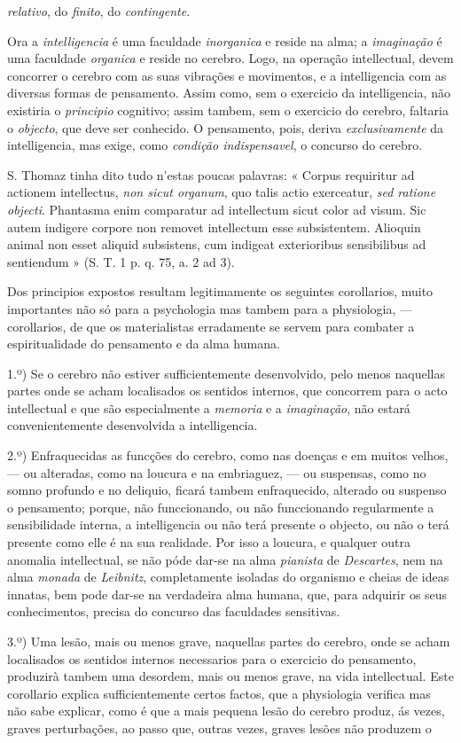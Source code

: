 \emph{relativo}, do \emph{finito}, do \emph{contingente}.\par Ora a \emph{intelligencia} é uma faculdade \emph{inorganica} e reside na alma; a \emph{imaginação} é uma faculdade \emph{organica} e reside no cerebro. Logo, na operação intellectual, devem concorrer o cerebro com as suas vibrações e movimentos, e a intelligencia com as diversas formas de pensamento. Assim como, sem o exercicio da intelligencia, não existiria o \emph{principio} cognitivo; assim tambem, sem o exercicio do cerebro, faltaria o \emph{objecto}, que deve ser conhecido. O pensamento, pois, deriva \emph{exclusivamente} da intelligencia, mas exige, como \emph{condição indispensavel}, o concurso do cerebro.\par S. Thomaz tinha dito tudo n'estas poucas palavras: « Corpus requiritur ad actionem intellectus, \emph{non sicut organum}, quo talis actio exerceatur, \emph{sed ratione objecti}. Phantasma enim comparatur ad intellectum sicut color ad visum. Sic autem indigere corpore non removet intellectum esse subsistentem. Alioquin animal non esset aliquid subsistens, cum indigeat exterioribus sensibilibus ad sentiendum » (S. T. 1 p. q. 75, a. 2 ad 3).\par Dos principios expostos resultam legitimamente os seguintes corollarios, muito importantes não só para a psychologia mas tambem para a physiologia, --- corollarios, de que os materialistas erradamente se servem para combater a espiritualidade do pensamento e da alma humana.\par 1.º) Se o cerebro não estiver sufficientemente desenvolvido, pelo menos naquellas partes onde se acham localisados os sentidos internos, que concorrem para o acto intellectual e que são especialmente a \emph{memoria} e a \emph{imaginação}, não estará convenientemente desenvolvida a intelligencia.\par 2.º) Enfraquecidas as funcções do cerebro, como nas doenças e em muitos velhos, --- ou alteradas, como na loucura e na embriaguez, --- ou suspensas, como no somno profundo e no deliquio, ficará tambem enfraquecido, alterado ou suspenso o pensamento; porque, não funccionando, ou não funccionando regularmente a sensibilidade interna, a intelligencia ou não terá presente o objecto, ou não o terá presente como elle é na sua realidade. Por isso a loucura, e qualquer outra anomalia intellectual, se não póde dar-se na alma \emph{pianista} de \emph{Descartes}, nem na alma \emph{monada} de \emph{Leibnitz}, completamente isoladas do organismo e cheias de ideas innatas, bem pode dar-se na verdadeira alma humana, que, para adquirir os seus conhecimentos, precisa do concurso das faculdades sensitivas.\par 3.º) Uma lesão, mais ou menos grave, naquellas partes do cerebro, onde se acham localisados os sentidos internos necessarios para o exercicio do pensamento, produzirà tambem uma desordem, mais ou menos grave, na vida intellectual. Este corollario explica sufficientemente certos factos, que a physiologia verifica mas não sabe explicar, como é que a mais pequena lesão do cerebro produz, ás vezes, graves perturbações, ao passo que, outras vezes, graves lesões não produzem o 